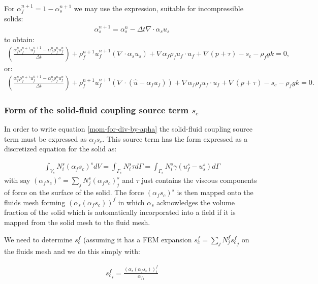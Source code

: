 For $\alpha_f^{n+1}=1-\alpha_s^{n+1}$ we may use the expression, suitable for incompressible solids:
\begin{eqnarray}
\alpha_s^{n+1}= \alpha_s^{n} - \Delta t \nabla \cdot \alpha_s u_s
\end{eqnarray}
to obtain:
\begin{eqnarray}
(\frac{\alpha_f^{n} \rho_f^{n+1} u_f^{n+1}-\alpha_f^{n} \rho_f^{n} u_f^n}{\Delta t})
+\rho_f^{n+1} u_f^{n+1} (\nabla \cdot \alpha_s u_s)
+ \nabla \alpha_f \rho_f u_f\cdot u_f
+\nabla (p+\tau)  -s_c -\rho_f g k=0,
\label{mom-for-div-by-apha-modelB-with-grad}
\end{eqnarray}
or:
\begin{eqnarray}
(\frac{\alpha_f^{n} \rho_f^{n+1} u_f^{n+1}-\alpha_f^{n} \rho_f^{n} u_f^n}{\Delta t})
+\rho_f^{n+1} u_f^{n+1} (\nabla \cdot (\hat u - \alpha_f u_f))
+ \nabla \alpha_f \rho_f u_f\cdot u_f
+\nabla (p+\tau)  -s_c -\rho_f g k=0.
\label{mom-for-div-by-apha-modelB-with-grad-or}
\end{eqnarray}

\subsubsection{Form of the solid-fluid coupling source term $s_c$}
In order to write equation \ref{mom-for-div-by-apha}
the solid-fluid coupling source term must be expressed
as $\alpha_f s_c$.
This source term has the form expressed as a discretized equation
for the solid as:

\begin{eqnarray}
\int_{V_s} N_i^s (\alpha_f s_c)^s dV= \int_{\Gamma_s} N_i^s \tau d\Gamma = \int_{\Gamma_s} N_i^s \gamma (u^s_f - u^s_s) d\Gamma
\end{eqnarray}
with say $(\alpha_f s_c)^s=\sum_j N_j^s (\alpha_f s_c)^s_j$
and $\tau$ just contains the viscous components of force
on the surface of the solid. The force $(\alpha_f s_c)^s$ is
then mapped onto the fluids mesh forming $(\alpha_s(\alpha_f s_c))^f$
in which $\alpha_s$ acknowledges the volume fraction of the
solid which is automatically incorporated into
a field if it is mapped from the solid mesh
to the fluid mesh.

We need to determine $s_c^f$ (assuming it has a FEM expansion
$s_c^f=\sum_j N_j^f {s_c^f}_j$ on the fluids mesh and we
do this simply with:

\begin{eqnarray}
{s_c^f}_i= \frac{(\alpha_s(\alpha_f s_c))^f_i}{{\alpha_f}_i}
\label{divid-f-by-alpha-f}
\end{eqnarray}

